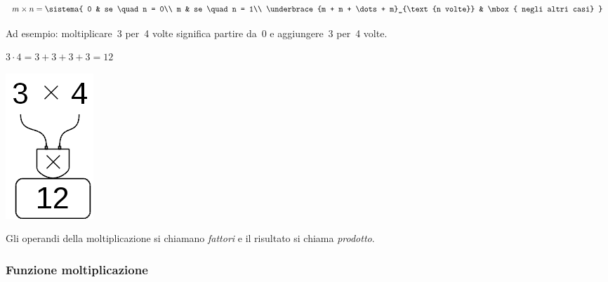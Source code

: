 \begin{inaccessibleblock}[
\begin{definizione}
\[
m \times n = \begin{cases}
 0 & se \quad n = 0\\
 m & se \quad n = 1\\
 \mbox{n volte}{(m + m + \dots + m)} & \mbox{ negli altri casi}
\end{cases}\]
\end{definizione}
]
\begin{definizione}
\[
m \times n = \sistema{
 0 & se \quad n = 0\\
 m & se \quad n = 1\\
 \underbrace{m + m + \dots + m}_{\text{n volte}} & \mbox{ negli altri casi}
}\]
\end{definizione}
\end{inaccessibleblock}

Ad esempio: moltiplicare~3 per~4 volte significa partire da~0 e 
aggiungere~3 per~4 volte.

\begin{minipage}{0.80\textwidth}
 \centering
 \(3 \cdot 4 = 3 + 3 + 3 + 3 = 12\)

% 
\end{minipage}%
\begin{minipage}{0.15\textwidth}
 \centering
\begin{inaccessibleblock}[]
 \includegraphics[scale=0.35]{img/op_mol.png}
\end{inaccessibleblock}
\end{minipage}%

Gli operandi della moltiplicazione si chiamano \emph{fattori} e il 
risultato si chiama \emph{prodotto}.

\subsubsection{Funzione moltiplicazione}

